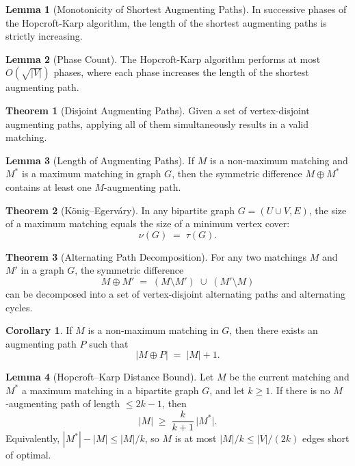 \documentclass{article}
\theoremstyle{definition}
\newtheorem{theorem}{Theorem}
\newtheorem{lemma}{Lemma}
\newtheorem{corollary}{Corollary}
\begin{document}
\begin{lemma}[Monotonicity of Shortest Augmenting Paths]
In successive phases of the Hopcroft-Karp algorithm, the length of the shortest augmenting paths is strictly increasing.
\end{lemma}

\begin{lemma}[Phase Count]
The Hopcroft-Karp algorithm performs at most $O(\sqrt{|V|})$ phases, where each phase increases the length of the shortest augmenting path.
\end{lemma}

\begin{theorem}[Disjoint Augmenting Paths]
Given a set of vertex-disjoint augmenting paths, applying all of them simultaneously results in a valid matching.
\end{theorem}

\begin{lemma}[Length of Augmenting Paths]
If $M$ is a non-maximum matching and $M^*$ is a maximum matching in graph $G$, then the symmetric difference $M \oplus M^*$ contains at least one $M$-augmenting path.
\end{lemma}

\begin{theorem}[König–Egerváry]
In any bipartite graph $G=(U\cup V,E)$, the size of a maximum matching equals the size of a minimum vertex cover:
\[
\nu(G) \;=\;\tau(G).
\]
\end{theorem}

\begin{theorem}[Alternating Path Decomposition]
For any two matchings $M$ and $M'$ in a graph $G$, the symmetric difference
\[
M \oplus M' \;=\;(M\setminus M')\;\cup\;(M'\setminus M)
\]
can be decomposed into a set of vertex‐disjoint alternating paths and alternating cycles.
\end{theorem}

\begin{corollary}
If $M$ is a non‐maximum matching in $G$, then there exists an augmenting path $P$ such that
\[
|M \oplus P| \;=\; |M| + 1.
\]
\end{corollary}

\begin{lemma}[Hopcroft–Karp Distance Bound]
\label{lem:hk-distance}
Let $M$ be the current matching and $M^*$ a maximum matching in a bipartite graph $G$, and let $k \geq 1$.  If there is no $M$‐augmenting path of length $\le 2k-1$, then
\[
|M| \;\ge\; \frac{k}{k+1}\,\bigl|M^*\bigr|.
\]
Equivalently, $|M^*| - |M| \le |M|/k$, so $M$ is at most $|M|/k \le |V|/(2k)$ edges short of optimal.
\end{lemma}
\end{document}
